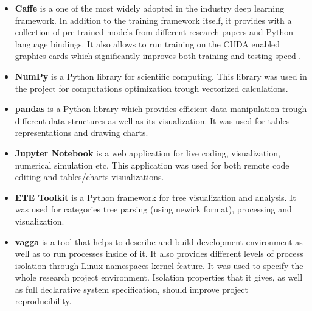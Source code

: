 \begin{itemize}
    \item \textbf{Caffe} \cite{Caffe} is a one of the most widely adopted in the industry deep learning framework. In addition to the training framework itself, it provides with a collection of pre-trained models from different research papers \cite{CaffeModelZoo} and Python language bindings. It also allows to run training on the CUDA \cite{CUDA} enabled graphics cards which significantly improves both training and testing speed \cite{Krizhevsky2012ImageNetDNN}.
    \item \textbf{NumPy} \cite{numpy} is a Python library for scientific computing. This library was used in the project for computations optimization trough vectorized calculations.
    \item \textbf{pandas} \cite{pandas} is a Python library which provides efficient data manipulation trough different data structures as well as its visualization. It was used for tables representations and drawing charts.
    \item \textbf{Jupyter Notebook} \cite{jupyter} is a web application for live coding, visualization, numerical simulation etc. This application was used for both remote code editing and tables/charts visualizations.
    \item \textbf{ETE Toolkit} \cite{ete3} is a Python framework for tree visualization and analysis. It was used for categories tree parsing (using newick \cite{newick} format), processing and visualization.
    \item \textbf{vagga} \cite{vagga} is a tool that helps to describe and build development environment as well as to run processes inside of it. It also provides different levels of process isolation through Linux namespaces \cite{namespaces} kernel feature. It was used to specify the whole research project environment. Isolation properties that it gives, as well as full declarative system specification, should improve project reproducibility.
\end{itemize}
